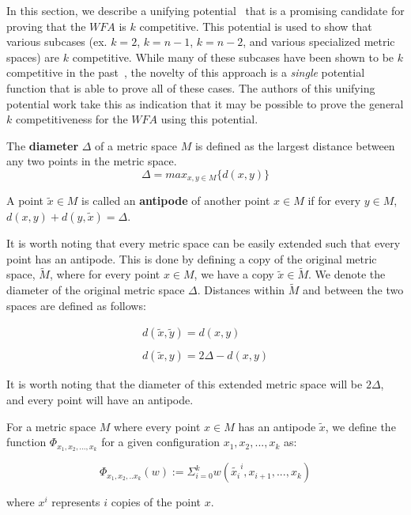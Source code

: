 In this section, we describe a unifying potential~\cite{unifyingPotential2021} that is a promising candidate for proving that the $WFA$ is $k$ competitive. This potential is used to show that various subcases (ex. $k=2$, $k=n-1$, $k=n-2$, and various specialized metric spaces) are $k$ competitive. While many of these subcases have been shown to be $k$ competitive in the past~\cite{server1991, server2009, server1996, server2004, server2002}, the novelty of this approach is a \textit{single} potential function that is able to prove all of these cases. The authors of this unifying potential work take this as indication that it may be possible to prove the general $k$ competitiveness for the $WFA$ using this potential.

\begin{definition}
    The \textbf{diameter} $\Delta$ of a metric space $M$ is defined as the largest distance between any two points in the metric space.
    \begin{equation*}
        \Delta = max_{x, y \in M} \{ d(x,y)\}
    \end{equation*}
\end{definition}

\begin{definition}
    A point $\tilde{x} \in M$ is called an \textbf{antipode} of another point $x \in M$ if for every $y \in M$, $d(x,y) + d(y, \tilde{x}) = \Delta$.
\end{definition}

It is worth noting that every metric space can be easily extended such that every point has an antipode. This is done by defining a copy of the original metric space, $\tilde{M}$, where for every point $x \in M$, we have a copy $\tilde{x} \in \tilde{M}$. We denote the diameter of the original metric space $\Delta$. Distances within $\tilde{M}$ and between the two spaces are defined as follows:

\begin{equation*}
    \begin{gathered}
        d(\tilde{x}, \tilde{y}) = d(x,y)\\ \\
        d(\tilde{x}, y) = 2\Delta - d(x,y)
    \end{gathered}
\end{equation*}

It is worth noting that the diameter of this extended metric space will be $2\Delta$, and every point will have an antipode.

\begin{definition}
    For a metric space $M$ where every point $x \in M$ has an antipode $\tilde{x}$, we define the function \textbf{$\Phi_{x_1, x_2, ..., x_k}$} for a given configuration $x_1, x_2, ..., x_k$ as:

    \begin{equation*}
        \Phi_{x_1, x_2, ..x_k}(w) := \Sigma_{i=0}^k w(\tilde{x_i}^i, x_{i+1}, ..., x_k)
    \end{equation*}

    where $x^i$ represents $i$ copies of the point $x$.
\end{definition}

